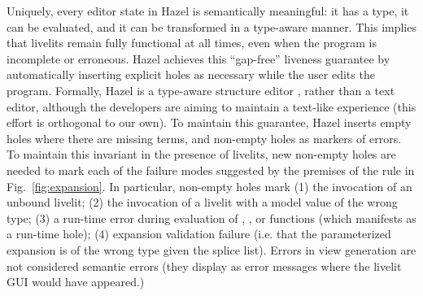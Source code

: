 Uniquely, every editor state in Hazel is 
semantically meaningful: it has a type, it can be evaluated, and it can be transformed 
in a type-aware manner. This implies that livelits remain fully functional at all times, 
even when the program is incomplete or erroneous. Hazel achieves this ``gap-free'' liveness guarantee by automatically inserting explicit holes as necessary 
while the user edits 
the program. Formally, Hazel is a type-aware structure editor \cite{Hazelnut}, rather than a text editor, 
although the developers are aiming to maintain a text-like experience (this effort is orthogonal to our own). 
To maintain this guarantee, Hazel inserts empty holes where there are missing terms, 
and non-empty holes as markers of errors. To maintain this invariant in the presence of livelits, 
new non-empty holes are needed to mark each of the failure modes suggested by the premises of the  rule in Fig.~\ref{fig:expansion}. 
In particular, non-empty holes mark (1) the invocation of an unbound livelit; (2) the invocation of a livelit 
with a model value of the wrong type; 
(3) a run-time error during evaluation of , , or  functions (which manifests as a run-time hole); (4) 
expansion validation failure (i.e. that the parameterized expansion is of the wrong type given the splice list).  
Errors in view generation are not considered semantic errors (they display as error messages where the livelit GUI would have appeared.)




